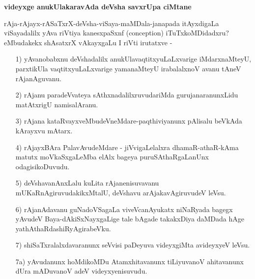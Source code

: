 \noindent
\textbf{videyxge anukUlakaravAda deVsha savxrUpa ciMtane}

rAja-rAjayx-rASaTxrX-deVsha-viSaya-maMDala-janapada itAyxdigaLa viSayadalilx yAva riVtiya kanesxpaSxnf ({\rm conception}) iTuTxkoMDidadxru? eMbudakekx shAsatxrX vAkayxgaLu I riVti irutatxve -

\begin{itemize}

\item [1)] yAvanobabxnu deVshadalilx anukUlavaqtitxyuLaLxvarige iMdarxnaMteyU, parxtikUla vaqtitxyuLaLxvarige yamanaMteyU irabalalxnoV avanu tAneV rAjanAguvanu.
\item [2)] rAjanu paradeVvateya sAthxnadalilxruvudariMda gurujanaranunxLidu matAtxrigU namisalAranu.
\item [3)] rAjana kataRvayxveMbudeVneMdare-paqthiviyanunx pAlisalu beVkAda kArayxvu mAtarx.
\item [4)] rAjayxBAra PalavAvudeMdare - jiVvigaLelalxra dhamaR-athaR-kAma matutx moVkaSxgaLeMba elAlx bageya puruSAthaRgaLanUnx odagisikoDuvudu.
\item [5)] deVshavanAnxLalu kuLita rAjanenisuvavanu mUKaRnAgiruvudakikxMtalU, deVshavu arAjakavAgiruvudeV leVsu.
\item [6)] rAjanAdavanu guNadoVSagaLa viveVcanAyukatx niNaRyada bagegx yAvudeV Baya-dAkiSxNayxgaLige tale bAgade takakxDiya daMDada hAge yathAthaRdashiRyAgirabeVku.
\item [7)] shiSaTxralalxdavaranunx seVvisi paDeyuva videyxgiMta avideyxyeV leVsu.
\item [7a)] yAvudanunx hoMdikoMDu Atamxhitavanunx tiLiyuvanoV ahitavanunx dUra mADuvanoV adeV videyxyenisuvudu.


\end{itemize}
